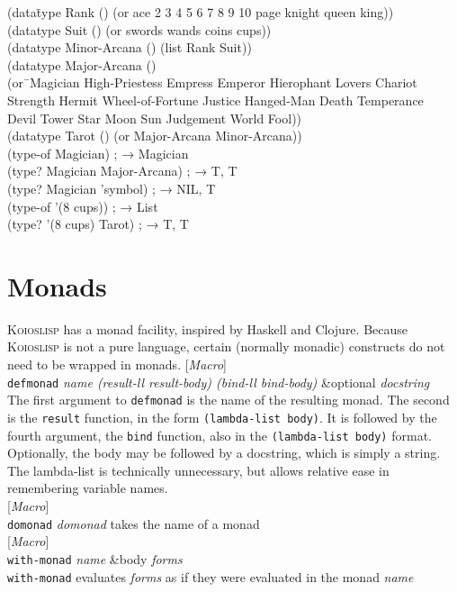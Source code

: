 \documentclass[10pt]{book}
\newenvironment{defother}[2]{[\textit{#1}]\\\texttt{#2}\index{#2}}{\\}
\newenvironment{defmacro}[1]{\begin{defother}{Macro}{#1}}{\end{defother}}
\newenvironment{lisp}{\begin{ttfamily}\begin{tabbing}}{\par\end{tabbing}\end{ttfamily}}
\begin{document}
\begin{lisp}
(data\= type Rank () (or ace 2 3 4 5 6 7 8 9 10 page knight queen king))\\
(datatype Suit () (or swords wands coins cups))\\
(datatype Minor-Arcana () (list Rank Suit))\\
(datatype Major-Arcana ()\\
\> (or\=\ Magician High-Priestess Empress Emperor Hierophant Lovers Chariot\\
\>\> Strength Hermit Wheel-of-Fortune Justice Hanged-Man Death Temperance\\
\>\> Devil Tower Star Moon Sun Judgement World Fool))\\
(datatype Tarot () (or Major-Arcana Minor-Arcana))\\
(type-of Magician) ; \textrm{→} Magician\\
(type? Magician Major-Arcana) ; \textrm{→} T, T\\
(type? Magician 'symbol) ; \textrm{→} NIL, T\\
(type-of '(8 cups)) ; \textrm{→} List\\
(type? '(8 cups) Tarot) ; \textrm{→} T, T\\
\end{lisp}
\section{Monads}
\textsc{Koioslisp} has a monad facility, inspired by Haskell and Clojure. Because \textsc{Koioslisp} is not a pure language, certain (normally monadic) constructs do not need to be wrapped in monads.
\begin{defmacro}{defmonad} \textit{name (result-ll result-body) (bind-ll bind-body)} \&optional \textit{docstring} \\
The first argument to \texttt{defmonad} is the name of the resulting monad. The second is the \texttt{result} function, in the form \texttt{(lambda-list body)}. It is followed by the fourth argument, the \texttt{bind} function, also in the \texttt{(lambda-list body)} format. Optionally, the body may be followed by a docstring, which is simply a string. The lambda-list is technically unnecessary, but allows relative ease in remembering variable names.\end{defmacro}
\begin{defmacro}{domonad}
\textit{domonad} takes the name of a monad \end{defmacro}
\begin{defmacro}{with-monad} \textit{name} \&body \textit{forms}\\
\texttt{with-monad} evaluates \textit{forms} as if they were evaluated in the monad \textit{name}
\end{defmacro}
\end{document}
